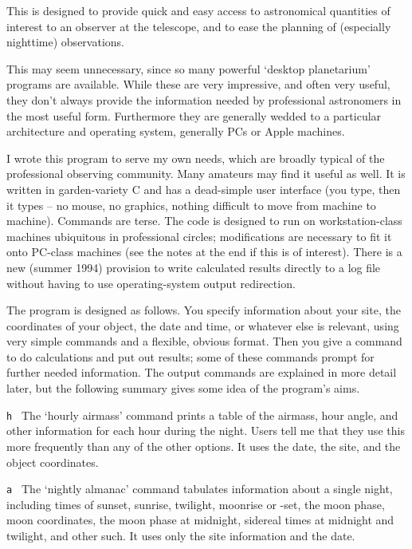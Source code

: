 
This is designed to provide quick and easy access to
astronomical quantities of interest to an observer at the telescope,
and to ease the planning of (especially nighttime) observations.

This may seem unnecessary, since so many powerful `desktop planetarium' 
programs are available.
While these are very impressive, and often very useful, they
don't always provide the information needed by professional astronomers
in the most useful form.  Furthermore they are generally wedded to a 
particular architecture and operating system, generally PCs or
Apple machines.  

I wrote this program to serve my own needs, which
are broadly typical of the professional observing community.
Many amateurs may find it useful as well.
It is written in garden-variety
C and has a dead-simple user interface (you type, then it types -- no
mouse, no graphics, nothing difficult to move from machine to machine).
Commands are terse.
The code is designed to run on workstation-class machines ubiquitous
in professional circles; modifications are necessary to fit it onto
PC-class machines (see the notes at the end if this is of interest).
There is a new (summer 1994) provision to write calculated results
directly to a log file without having to use operating-system
output redirection.

The program is designed as follows.  You specify information about 
your site, the coordinates of your object, the date and time, or
whatever else is relevant, using very simple commands and a flexible,
obvious format.  Then you give a command to do calculations
and put out results; some of these commands prompt for further
needed information.  The output commands are
explained in more detail later, but the following summary gives some idea
of the program's aims.

\item{\tt h } The `hourly airmass' command prints a table of the 
airmass, hour angle, and other information for each hour during the
night.  Users tell me that they use this more frequently than any
of the other options.  It uses the date, the site, and the object coordinates. 

\item{\tt a } The `nightly almanac' command tabulates information
about a single night, including times of sunset, sunrise, twilight, moonrise
or -set, the moon phase, moon coordinates, the moon phase at midnight,
sidereal times at midnight and twilight, and other such.  It uses
only the site information and the date.

